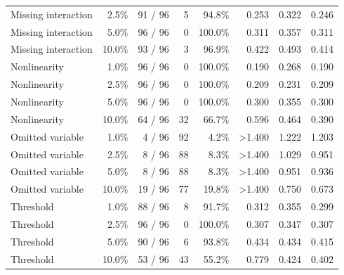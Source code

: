 \begin{table}[htbp]
{\begin{tabular}{@{}lrrrrrrr@{}}
Missing interaction & 2.5\% & 91 / 96 & 5 & 94.8\% & 0.253 & 0.322 & 0.246 \\
Missing interaction & 5.0\% & 96 / 96 & 0 & 100.0\% & 0.311 & 0.357 & 0.311 \\
Missing interaction & 10.0\% & 93 / 96 & 3 & 96.9\% & 0.422 & 0.493 & 0.414 \\
\addlinespace
Nonlinearity & 1.0\% & 96 / 96 & 0 & 100.0\% & 0.190 & 0.268 & 0.190 \\
Nonlinearity & 2.5\% & 96 / 96 & 0 & 100.0\% & 0.209 & 0.231 & 0.209 \\
Nonlinearity & 5.0\% & 96 / 96 & 0 & 100.0\% & 0.300 & 0.355 & 0.300 \\
Nonlinearity & 10.0\% & 64 / 96 & 32 & 66.7\% & 0.596 & 0.464 & 0.390 \\
\addlinespace
Omitted variable & 1.0\% & 4 / 96 & 92 & 4.2\% & >1.400 & 1.222 & 1.203 \\
Omitted variable & 2.5\% & 8 / 96 & 88 & 8.3\% & >1.400 & 1.029 & 0.951 \\
Omitted variable & 5.0\% & 8 / 96 & 88 & 8.3\% & >1.400 & 0.951 & 0.936 \\
Omitted variable & 10.0\% & 19 / 96 & 77 & 19.8\% & >1.400 & 0.750 & 0.673 \\
\addlinespace
Threshold & 1.0\% & 88 / 96 & 8 & 91.7\% & 0.312 & 0.355 & 0.299 \\
Threshold & 2.5\% & 96 / 96 & 0 & 100.0\% & 0.307 & 0.347 & 0.307 \\
Threshold & 5.0\% & 90 / 96 & 6 & 93.8\% & 0.434 & 0.434 & 0.415 \\
Threshold & 10.0\% & 53 / 96 & 43 & 55.2\% & 0.779 & 0.424 & 0.402 \\
\bottomrule
\end{tabular}%
}
\end{table}
